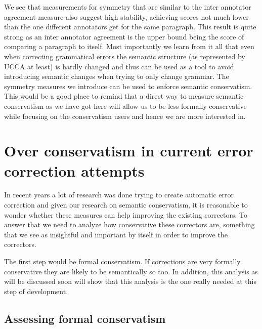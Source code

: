 \documentclass[english]{article}
\begin{document}
We see that measurements for symmetry that are similar to the inter
annotator agreement measure also suggest high stability, achieving
scores not much lower than the one different annotators get for the
same paragraph. This result is quite strong as an inter annotator
agreement is the upper bound being the score of comparing a paragraph
to itself. Most importantly we learn from it all that even when correcting
grammatical errors the semantic structure (as represented by UCCA
at least) is hardly changed and thus can be used as a tool to avoid
introducing semantic changes when trying to only change grammar. The
symmetry measures we introduce can be used to enforce semantic conservatism.
This would be a good place to remind that a direct way to measure
semantic conservatism as we have got here will allow us to be less
formally conservative while focusing on the conservatism users and
hence we are more interested in.

\section{Over conservatism in current error correction attempts}

In recent years a lot of research was done trying to create automatic
error correction\cite{rozovskaya2014building,rozovskaya2010annotating,ng2014conll,kao2013conll}
and given our research on semantic conservatism, it is reasonable
to wonder whether these measures can help improving the existing correctors.
To answer that we need to analyze how conservative these correctors
are, something that we see as insightful and important by itself in
order to improve the correctors.

The first step would be formal conservatism. If corrections are very
formally conservative they are likely to be semantically so too. In
addition, this analysis as will be discussed soon will show that this
analysis is the one really needed at this step of development.

\subsection{Assessing formal conservatism}
\end{document}
